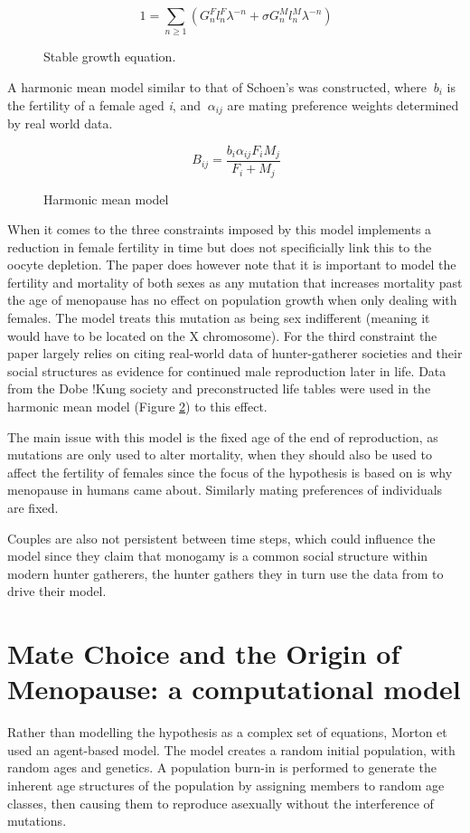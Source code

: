 \documentclass[authoryearcitations]{UoYCSproject}
\begin{document}
\begin{figure}[h]
$$\ 1 = \sum_{n\geq 1}(G_n^Fl_n^F\lambda ^{-n} + \sigma G_n^Ml_n^M\lambda ^{-n}) $$
\caption{Stable growth equation.}
\label{fig:stableGrowth}
\end{figure}


A harmonic mean model similar to that of Schoen's \cite{schoen1981harmonic} was constructed, where $\ b_i $ is the fertility of a female aged \textit{i}, and $\ \alpha_{ij} $ are mating preference weights determined by real world data.

\begin{figure}[h]
$$\ B_{ij} = \frac{b_i\alpha_{ij}F_iM_j}{F_i + M_j} $$
\caption{Harmonic mean model}
\label{fig:harmonicMean}
\end{figure}

When it comes to the three constraints imposed by \cite{patriarchHypothesis2000} this model implements a reduction in female fertility in time but does not specificially link this to the oocyte depletion. The paper does however note that it is important to model the fertility and mortality of both sexes as any mutation that increases mortality past the age of menopause has no effect on population growth when only dealing with females. The model treats this mutation as being sex indifferent (meaning it would have to be located on the X chromosome). For the third constraint the paper largely relies on citing real-world data of hunter-gatherer societies and their social structures as evidence for continued male reproduction later in life. Data from the Dobe !Kung society \cite{howell1979demography} and preconstructed life tables \cite{gurven2007hunter} were used in the harmonic mean model (Figure \ref{fig:harmonicMean}) to this effect.

The main issue with this model is the fixed age of the end of reproduction, as mutations are only used to alter mortality, when they should also be used to affect the fertility of females since the focus of the hypothesis is based on is why menopause in humans came about. Similarly mating preferences of individuals are fixed.

Couples are also not persistent between time steps, which could influence the model since they claim that monogamy is a common social structure within modern hunter gatherers, the hunter gathers they in turn use the data from to drive their model. 

\section{Mate Choice and the Origin of Menopause: a computational model}
Rather than modelling the hypothesis as a complex set of equations, Morton et \cite{mateChoice2013} used an agent-based model. The model creates a random initial population, with random ages and genetics. A population burn-in is performed to generate the inherent age structures of the population by assigning members to random age classes, then causing them to reproduce asexually without the interference of mutations.
\end{document}
